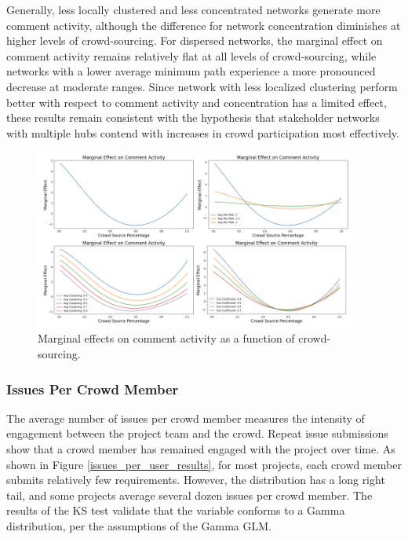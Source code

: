 Generally, less locally clustered and less concentrated networks generate more comment activity, although the difference for network concentration diminishes at higher levels of crowd-sourcing. For dispersed networks, the marginal effect on comment activity remains relatively flat at all levels of crowd-sourcing, while networks with a lower average minimum path experience a more pronounced decrease at moderate ranges. Since network with less localized clustering perform better with respect to comment activity and concentration has a limited effect, these results remain consistent with the hypothesis that stakeholder networks with multiple hubs contend with increases in crowd participation most effectively.

\begin{figure}
  \includegraphics[width=0.95\textwidth]{comment_activity_marginal.PNG}
\caption{Marginal effects on comment activity as a function of crowd-sourcing.}
\label{comment_activity_marginal}
\end{figure}

\subsubsection{Issues Per Crowd Member}

The average number of issues per crowd member measures the intensity of engagement between the project team and the crowd. Repeat issue submissions show that a crowd member has remained engaged with the project over time. As shown in Figure \ref{issues_per_user_results}, for most projects, each crowd member submits relatively few requirements. However, the distribution has a long right tail, and some projects average several dozen issues per crowd member. The results of the KS test validate that the variable conforms to a Gamma distribution, per the assumptions of the Gamma GLM.

